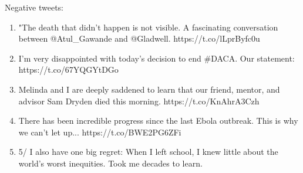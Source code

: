 \documentclass[a4paper]{article}
\begin{document}
Negative tweets:

\begin{enumerate}
\item "The death that didn't happen is not visible. A fascinating conversation between @Atul_Gawande and @Gladwell. https://t.co/lLprByfc0u

\item I'm very disappointed with today's decision to end #DACA. Our statement: https://t.co/67YQGYtDGo

\item Melinda and I are deeply saddened to learn that our friend, mentor, and advisor Sam Dryden died this morning. https://t.co/KnAhrA3Czh

\item There has been incredible progress since the last Ebola outbreak. This is why we can't let up... https://t.co/BWE2PG6ZFi

\item 5/ I also have one big regret: When I left school, I knew little about the world's worst inequities. Took me decades to learn.
\end{enumerate}
\end{document}
